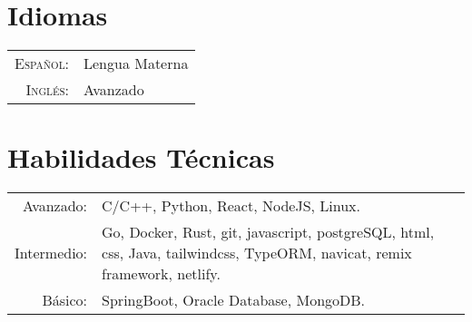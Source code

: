 \documentclass[a4paper,10pt]{article} %
\begin{document}
\section{Idiomas}

\begin{tabular}{rl}
    \textsc{Espa\~nol:} & Lengua Materna\\

    \textsc{Ingl\'es:} & Avanzado\\
\end{tabular}


\section{Habilidades T\'ecnicas}

\begin{tabular}{rl}
    Avanzado: & C/C++, Python, React, NodeJS, Linux.\\
    Intermedio: & \parbox[t]{0.8\textwidth}{Go, Docker, Rust, git, javascript, postgreSQL, html, css, Java, tailwindcss, TypeORM, navicat, remix framework, netlify.}\\
    B\'asico: & SpringBoot, Oracle Database, MongoDB.
\end{tabular}


%

\end{document}

